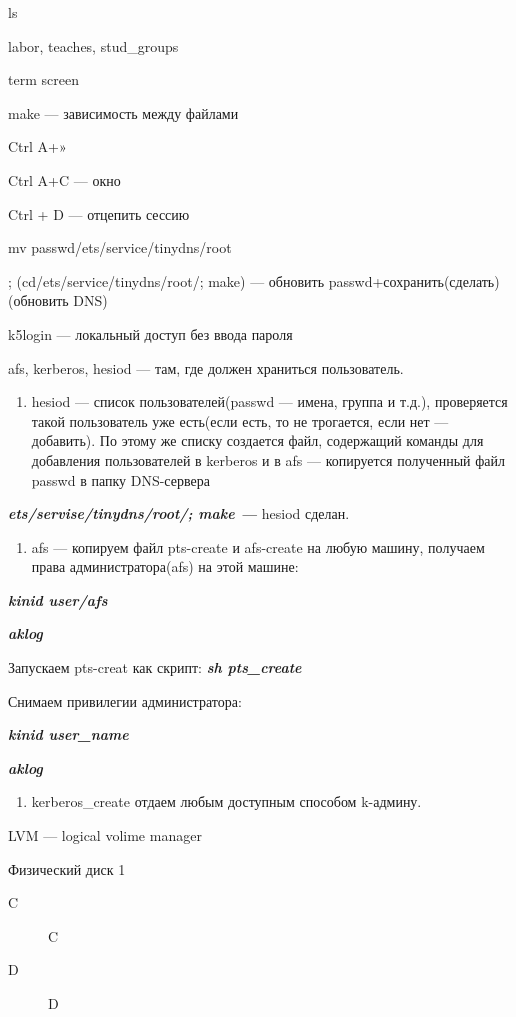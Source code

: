 \par 
ls
\par 
labor, teaches, stud\_groups
\par 
term screen
\par 
make — зависимость между файлами
\par Ctrl
A+»
\par 
Ctrl A+C — окно 

\par 
Ctrl + D — отцепить сессию
\par 
mv passwd/ets/service/tinydns/root
\par 
; (cd/ets/service/tinydns/root/; make) — обновить
passwd+сохранить(сделать)(обновить DNS)
\par 
k5login — локальный доступ без ввода
пароля
\par 
afs, kerberos, hesiod — там, где должен
храниться пользователь.
\begin{enumerate}
	\item \par 
	hesiod — список пользователей(passwd
	— имена, группа и т.д.), проверяется
	такой пользователь уже есть(если есть,
	то не трогается, если нет — добавить).
	По этому же списку создается файл,
	содержащий команды для добавления
	пользователей в kerberos и в afs — копируется
	полученный файл passwd в папку DNS-сервера
\end{enumerate}
\par 
\textit{\textbf{ets/servise/tinydns/root/;
make —}}
hesiod сделан.
\begin{enumerate}
	\item \par 
	afs
	— копируем файл pts-create и afs-create на любую
	машину, получаем права администратора(afs)
	на этой машине:
\end{enumerate}
\par 
\textit{\textbf{kinid user/afs}}
\par 
\textit{\textbf{aklog}}
\par 
Запускаем
pts-creat как скрипт: \textit{\textbf{sh
pts\_create}}
\par 
Снимаем привилегии администратора:


\par 
\textit{\textbf{kinid user\_name}}
\par 
\textit{\textbf{aklog}}
\begin{enumerate}
	\item \par 
	kerberos\_create отдаем любым доступным
	способом k-админу.
\end{enumerate}
\par 
LVM — logical volime manager
\par 
Физический диск 1
\begin{description}
\item [C] C
\item [D] D
\end{description}



